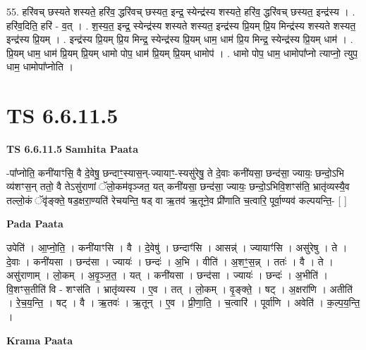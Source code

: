 \documentclass[17pt]{extarticle}
\begin{document}
55. हरि॑वच् छस्यते शस्यते॒ हरि॑व॒ द्धरि॑वच् छस्यत॒ इन्द्र॒ स्येन्द्र॑स्य शस्यते॒ हरि॑व॒ द्धरि॑वच् छस्यत॒ इन्द्र॑स्य । . हरि॑व॒दिति॒ हरि॑ - व॒त् । . श॒स्य॒त॒ इन्द्र॒ स्येन्द्र॑स्य शस्यते शस्यत॒ इन्द्र॑स्य प्रि॒यम् प्रि॒य मिन्द्र॑स्य शस्यते शस्यत॒ इन्द्र॑स्य प्रि॒यम् । . इन्द्र॑स्य प्रि॒यम् प्रि॒य मिन्द्र॒ स्येन्द्र॑स्य प्रि॒यम् धाम॒ धाम॑ प्रि॒य मिन्द्र॒ स्येन्द्र॑स्य प्रि॒यम् धाम॑ । . प्रि॒यम् धाम॒ धाम॑ प्रि॒यम् प्रि॒यम् धामो पोप॒ धाम॑ प्रि॒यम् प्रि॒यम् धामोप॑ । . धामो पोप॒ धाम॒ धामोपा᳚प्नो त्याप्नो॒ त्युप॒ धाम॒ धामोपा᳚प्नोति । \newline
\pagebreak
{}

\section{ TS 6.6.11.5 }

\textbf{TS 6.6.11.5 } \newline
\textbf{Samhita Paata} \newline

-पा᳚प्नोति॒ कनी॑याꣳसि॒ वै दे॒वेषु॒ छन्दाꣳ॒॒स्यास॒न्-ज्यायाꣳ॒॒-स्यसु॑रेषु॒ ते दे॒वाः कनी॑यसा॒ छन्द॑सा॒ ज्यायः॒ छन्दो॒ऽभि व्य॑शꣳस॒न् ततो॒ वै तेऽसु॑राणां ॅलो॒कम॑वृञ्जत॒ यत् कनी॑यसा॒ छन्द॑सा॒ ज्यायः॒ छन्दो॒ऽभिवि॒शꣳस॑ति॒ भ्रातृ॑व्यस्यै॒व तल्लो॒कं ॅवृ॑ङ्क्ते॒ षड॒क्षरा॒ण्यति॑ रेचयन्ति॒ षड् वा ऋ॒तव॑ ऋ॒तूने॒व प्री॑णाति च॒त्वारि॒ पूर्वा॒ण्यव॑ कल्पयन्ति॒- [  ] \newline

\textbf{Pada Paata} \newline

उपेति॑ । आ॒प्नो॒ति॒ । कनी॑याꣳसि । वै । दे॒वेषु॑ । छन्दाꣳ॑सि । आसन्न्॑ । ज्यायाꣳ॑सि ।   असु॑रेषु । ते । दे॒वाः । कनी॑यसा । छन्द॑सा । ज्यायः॑ । छन्दः॑ । अ॒भि । वीति॑ । अ॒शꣳ॒॒स॒न्न् । ततः॑ । वै । ते । असु॑राणाम् । लो॒कम् । अ॒वृ॒ञ्ज॒त॒ । यत् । कनी॑यसा । छन्द॑सा । ज्यायः॑ । छन्दः॑ । अ॒भीति॑ । वि॒शꣳस॒तीति॑ वि - शꣳस॑ति । भ्रातृ॑व्यस्य । ए॒व । तत् । लो॒कम् । वृ॒ङ्क्ते॒ । षट् । अ॒क्षरा॑णि । अतीति॑ । रे॒च॒य॒न्ति॒ । षट् । वै । ऋ॒तवः॑ । ऋ॒तून् । ए॒व । प्री॒णा॒ति॒ । च॒त्वारि॑ । पूर्वा॑णि । अवेति॑ । क॒ल्प॒य॒न्ति॒ ।  \newline


\textbf{Krama Paata} \newline
\end{document}
